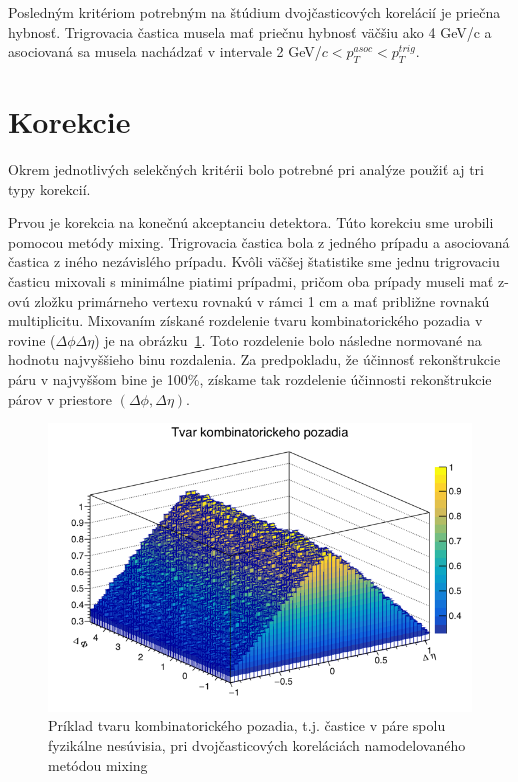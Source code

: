 \documentclass[thesismargins, thesislinespacing]{rnthesis}
\begin{document}
Posledným kritériom potrebným na štúdium dvojčasticových korelácií je priečna hybnosť. Trigrovacia častica musela mať priečnu hybnosť väčšiu ako 4 GeV/c a asociovaná sa musela nachádzať v intervale 2 GeV/$c<p_T^{asoc}<p_T^{trig}$.

\section{Korekcie}
Okrem jednotlivých selekčných kritérii bolo potrebné pri analýze použiť aj tri typy korekcií. 

Prvou je korekcia na konečnú akceptanciu detektora. Túto korekciu sme urobili pomocou metódy mixing. Trigrovacia častica bola z jedného prípadu a asociovaná častica z iného nezávislého prípadu. Kvôli väčšej štatistike sme jednu trigrovaciu časticu mixovali s minimálne piatimi prípadmi, pričom oba prípady museli mať z-ovú zložku primárneho vertexu rovnakú v rámci 1 cm a mať približne rovnakú multiplicitu. Mixovaním získané rozdelenie tvaru kombinatorického pozadia v rovine ($\Delta \phi \Delta \eta$) je na obrázku~\ref{pozadie}. Toto rozdelenie bolo následne normované na hodnotu najvyššieho binu rozdalenia. Za predpokladu, že účinnosť rekonštrukcie páru v najvyššom bine je 100\%, získame tak rozdelenie účinnosti rekonštrukcie párov v priestore $(\Delta \phi,\Delta\eta)$.

\begin{figure}[hbtp!]
	\centering
	\includegraphics[scale=0.5]{./Obrazky_praca/pozadie.png}
	\caption{Príklad tvaru kombinatorického pozadia, t.j. častice v páre spolu fyzikálne nesúvisia, pri dvojčasticových koreláciách namodelovaného metódou mixing}
	\label{pozadie}
\end{figure}
\end{document}
